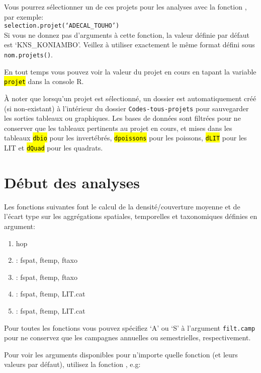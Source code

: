 \documentclass{article}
\begin{document}
Vous pourrez sélectionner un de ces projets pour les analyses avec la
fonction , par exemple:\\

\texttt{selection.projet(`ADECAL\_TOUHO')}\\

Si vous ne donnez pas d'arguments à cette fonction, la valeur définie
par défaut est `KNS\_KONIAMBO'. Veillez à utiliser exactement le même
format défini sous \texttt{nom.projets()}.

En tout temps vous pouvez voir la valeur du projet en cours en tapant
la variable \hl{\texttt{projet}} dans la console R.

À noter que lorsqu'un projet est sélectionné, un dossier est
automatiquement créé (si non-existant) à l'intérieur du dossier
\texttt{Codes-tous-projets} pour sauvegarder les sorties tableaux ou
graphiques. Les bases de données sont filtrées pour ne conserver que
les tableaux pertinents au projet en cours, et mises dans les tableaux
\hl{\texttt{dbio}} pour les invertébrés, \hl{\texttt{dpoissons}} pour les
poissons, \hl{\texttt{dLIT}} pour les LIT et \hl{\texttt{dQuad}} pour les quadrats.

\section{Début des analyses}

Les fonctions suivantes font le calcul de la densité/couverture
moyenne et de l'écart type sur les aggrégations spatiales, temporelles
et taxonomiques définies en argument:
\begin{enumerate}
\item hop
\item {}: fspat, ftemp, ftaxo
\item {}: fspat, ftemp, ftaxo
\item {}: fspat, ftemp, LIT.cat
\item {}: fspat, ftemp, LIT.cat
\end{enumerate}

Pour toutes les fonctions vous pouvez spécifiez `A' ou `S' à
l'argument \texttt{filt.camp} pour ne conservez que les campagnes
annuelles ou semestrielles, respectivement.

Pour voir les arguments disponibles pour n'importe quelle fonction (et leurs valeurs
par défaut), utilisez la fonction , e.g:
\end{document}
